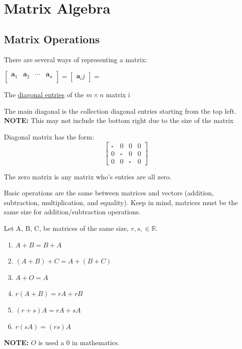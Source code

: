 \documentclass{report}
\begin{document}
\chapter{Matrix Algebra}
\section{Matrix Operations}
There are several ways of representing a matrix:\\
\begin{center}
$\begin{bmatrix}
\mathbf{a}_1 & \mathbf{a}_2 & \dotsb & \mathbf{a}_n \\ 
\end{bmatrix}
=
\begin{bmatrix}
\mathbf{a}_ij
\end{bmatrix}
=
$
\end{center}
\begin{definition}
The \underline{diagonal entries} of the $m \times n$ matrix i
\end{definition}

\begin{definition}
The main diagonal is the collection diagonal entries starting from the top left. \textbf{NOTE:} This may not include the bottom right due to the size of the matrix
\end{definition}

\begin{definition}
Diagonal matrix has the form:
\begin{equation*}
	\begin{bmatrix}
	\square & 0 & 0 & 0 \\ 
	0 & \square & 0 & 0 \\ 
	0 & 0 & \square & 0
	\end{bmatrix}
\end{equation*}
\end{definition}

\begin{definition}
The zero matrix is any matrix who's entries are all zero.
\end{definition}

Basic operations are the same between matrices and vectors (addition, subtraction, multiplication, and equality). Keep in mind, matrices must be the same size for addition/subtraction operations.

\begin{theorem}
Let A, B, C, be matrices of the same size, $r,s,\in \mathbb{R}$.
\begin{enumerate}
	\item $A+B = B+A$
	\item $(A + B) + C = A + (B + C)$
	\item $A + O = A$
	\item $r(A +B) = rA +rB$
	\item $(r +s)A = rA +sA$
	\item $r(sA) = (rs)A$
\end{enumerate}
\textbf{NOTE:} $O$ is used a 0 in mathematics.
\end{theorem}
\end{document}
